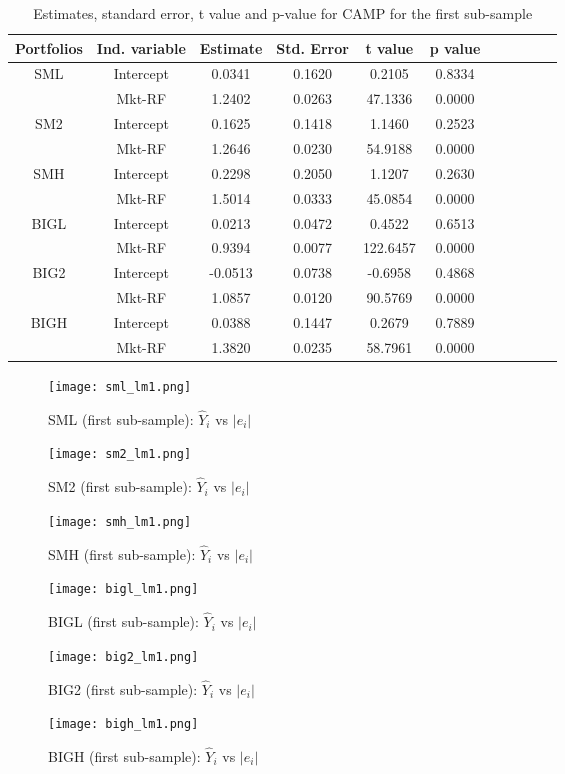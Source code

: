 \documentclass[11pt]{article}
\begin{document}
\begin{table}
\centering
\begin{tabular}{ccccccccccc}
  \hline
 Portfolios&Ind. variable& Estimate & Std. Error & t value & p value \\ 
  \hline
SML&Intercept  & 0.0341 & 0.1620 & 0.2105 & 0.8334 \\ 
  &Mkt-RF & 1.2402 & 0.0263 & 47.1336 & 0.0000 \\ 
  SM2& Intercept & 0.1625 & 0.1418 & 1.1460 & 0.2523 \\ 
  &Mkt-RF & 1.2646 & 0.0230 & 54.9188 & 0.0000 \\ 
  SMH& Intercept & 0.2298 & 0.2050 & 1.1207 & 0.2630 \\ 
  &Mkt-RF & 1.5014 & 0.0333 & 45.0854 & 0.0000 \\ 
  BIGL& Intercept & 0.0213 & 0.0472 & 0.4522 & 0.6513 \\ 
  &Mkt-RF & 0.9394 & 0.0077 & 122.6457 & 0.0000 \\ 
  BIG2& Intercept & -0.0513 & 0.0738 & -0.6958 & 0.4868 \\ 
  &Mkt-RF & 1.0857 & 0.0120 & 90.5769 & 0.0000 \\ 
  BIGH& Intercept & 0.0388 & 0.1447 & 0.2679 & 0.7889 \\ 
  &Mkt-RF & 1.3820 & 0.0235 & 58.7961 & 0.0000 \\ 
   \hline
\end{tabular}
\caption{ Estimates, standard error, t value and p-value for CAMP for the first sub-sample}\label{tab2}
\end{table}

\begin{figure}
\centering
\texttt{[image: sml\_lm1.png]}
\caption{SML (first sub-sample): $\hat{Y}_i$ vs $|e_i|$}
\label{smllm1}
\texttt{[image: sm2\_lm1.png]}
\caption{SM2 (first sub-sample): $\hat{Y}_i$ vs $|e_i|$}
\label{sm2lm1}
\end{figure}
\begin{figure}
\centering
\texttt{[image: smh\_lm1.png]}
\caption{SMH (first sub-sample): $\hat{Y}_i$ vs $|e_i|$}
\label{smhlm1}
\texttt{[image: bigl\_lm1.png]}
\caption{BIGL (first sub-sample): $\hat{Y}_i$ vs $|e_i|$}
\label{bigllm1}
\end{figure}
\begin{figure}
\centering
\texttt{[image: big2\_lm1.png]}
\caption{BIG2 (first sub-sample): $\hat{Y}_i$ vs $|e_i|$}
\label{big2lm1}
\texttt{[image: bigh\_lm1.png]}
\caption{BIGH (first sub-sample): $\hat{Y}_i$ vs $|e_i|$}
\label{bighlm1}
\end{figure}
\end{document}
